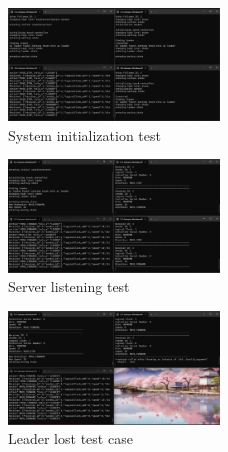 
\begin{figure}[ht]
    \centering
    \includegraphics[width=0.5\textwidth]{images/SystemTest_Init.png}
    \caption{System initialization test}
    \label{img:SystemTest_Init}
\end{figure}

\begin{figure}[ht]
    \centering
    \includegraphics[width=0.5\textwidth]{images/SystemTest_Listen.png}
    \caption{Server listening test}
    \label{img:SystemTest_Listen}
\end{figure}

\begin{figure}[ht]
    \centering
    \includegraphics[width=0.5\textwidth]{images/SystemTest_Case.png}
    \caption{Leader lost test case}
    \label{img:SystemTest_Case}
\end{figure}

